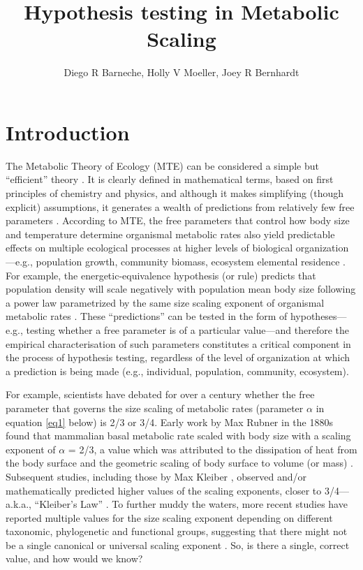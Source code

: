 \documentclass[a4paper,12pt]{article}
\title{Hypothesis testing in Metabolic Scaling}
\author{Diego R Barneche, Holly V Moeller, Joey R Bernhardt}
\begin{document}
\maketitle

\section{Introduction}

The Metabolic Theory of Ecology (MTE) can be considered a simple but ``efficient'' theory \citep{marquet2014bioscience}. It is clearly defined in mathematical terms, based on first principles of chemistry and physics, and although it makes simplifying (though explicit) assumptions, it generates a wealth of predictions from relatively few free parameters \citep{marquet2014bioscience, brown2004ecology}. According to MTE, the free parameters that control how body size and temperature determine organismal metabolic rates also yield predictable effects on multiple ecological processes at higher levels of biological organization---e.g., population growth, community biomass, ecosystem elemental residence \citep{brown2004ecology, savage2004amnat, allen2005functecol, barneche2014ele, schramski2015pnas}. For example, the energetic-equivalence hypothesis (or rule) predicts that population density will scale negatively with population mean body size following a power law parametrized by the same size scaling exponent of organismal metabolic rates \citep{damuth1987biollin, allen2002science, barneche2016procb}. These ``predictions'' can be tested in the form of hypotheses---e.g., testing whether a free parameter is of a particular value---and therefore the empirical characterisation of such parameters constitutes a critical component in the process of hypothesis testing, regardless of the level of organization at which a prediction is being made (e.g., individual, population, community, ecosystem).

For example, scientists have debated for over a century whether the free parameter that governs the size scaling of metabolic rates (parameter $\alpha$ in equation \ref{eq1} below) is 2/3 or 3/4. Early work by Max Rubner in the 1880s found that mammalian basal metabolic rate scaled with body size with a scaling exponent of $\alpha$ = 2/3, a value which was attributed to the dissipation of heat from the body surface and the geometric scaling of body surface to volume (or mass) \citep{rubner1883zeibiol}. Subsequent studies, including those by Max Kleiber \citeyearpar{kleiber1932hilgardia}, observed and/or mathematically predicted higher values of the scaling exponents, closer to 3/4---a.k.a., ``Kleiber's Law'' \citep{west1997science, west1999science}. To further muddy the waters, more recent studies have reported multiple values for the size scaling exponent depending on different taxonomic, phylogenetic and functional groups, suggesting that there might not be a single canonical or universal scaling exponent \citep[e.g.,][]{white2003pnas, white2005jeb, delong2010pnas}\citep[but see][for recent extensions of theoretical predictions]{brummer2017plosbiol}. So, is there a single, correct value, and how would we know?
\end{document}

